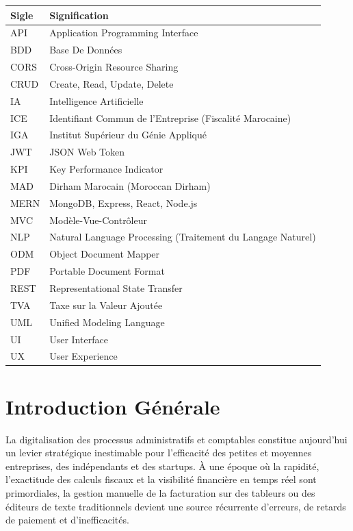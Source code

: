 \documentclass[a4paper,12pt]{extarticle}
\begin{document}
\begin{tabular}{ll}
\toprule
\textbf{Sigle} & \textbf{Signification} \\
\midrule
API   & Application Programming Interface \\
BDD   & Base De Données \\
CORS  & Cross-Origin Resource Sharing \\
CRUD  & Create, Read, Update, Delete \\
IA    & Intelligence Artificielle \\
ICE   & Identifiant Commun de l'Entreprise (Fiscalité Marocaine) \\
IGA   & Institut Supérieur du Génie Appliqué \\
JWT   & JSON Web Token \\
KPI   & Key Performance Indicator \\
MAD   & Dirham Marocain (Moroccan Dirham) \\
MERN  & MongoDB, Express, React, Node.js \\
MVC   & Modèle-Vue-Contrôleur \\
NLP   & Natural Language Processing (Traitement du Langage Naturel) \\
ODM   & Object Document Mapper \\
PDF   & Portable Document Format \\
REST  & Representational State Transfer \\
TVA   & Taxe sur la Valeur Ajoutée \\
UML   & Unified Modeling Language \\
UI    & User Interface \\
UX    & User Experience \\
\bottomrule
\end{tabular}

\newpage
{}

\section*{Introduction Générale}

La digitalisation des processus administratifs et comptables constitue aujourd'hui un levier stratégique inestimable pour l'efficacité des petites et moyennes entreprises, des indépendants et des startups. À une époque où la rapidité, l'exactitude des calculs fiscaux et la visibilité financière en temps réel sont primordiales, la gestion manuelle de la facturation sur des tableurs ou des éditeurs de texte traditionnels devient une source récurrente d'erreurs, de retards de paiement et d'inefficacités.
\end{document}
